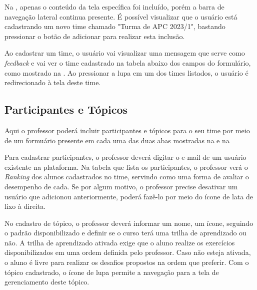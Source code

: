 
Na , apenas o conteúdo da tela específica foi incluído, porém a barra de navegação lateral continua presente. É possível visualizar que o usuário está cadastrando um novo time chamado "Turma de APC 2023/1", bastando pressionar o botão de adicionar para realizar esta inclusão.


Ao cadastrar um time, o usuário vai visualizar uma mensagem que serve como \textit{feedback} e vai ver o time cadastrado na tabela abaixo dos campos do formulário, como mostrado na . Ao pressionar a lupa em um dos times listados, o usuário é redirecionado à tela deste time.

\subsection{Participantes e Tópicos}

Aqui o professor poderá incluir participantes e tópicos para o seu time por meio de um formuário presente em cada uma das duas abas mostradas na  e na  


Para cadastrar participantes, o professor deverá digitar o e-mail de um usuário existente na plataforma. Na tabela que lista os participantes, o professor verá o \textit{Ranking} dos alunos cadastrados no time, servindo como uma forma de avaliar o desempenho de cada. Se por algum motivo, o professor precise desativar um usuário que adicionou anteriormente, poderá fazê-lo por meio do ícone de lata de lixo à direita.


No cadastro de tópico, o professor deverá informar um nome, um ícone, seguindo o padrão disponibilizado e definir se o curso terá uma trilha de aprendizado ou não. A trilha de aprendizado ativada exige que o aluno realize os exercícios disponibilizados em uma ordem definida pelo professor. Caso não esteja ativada, o aluno é livre para realizar os desafios propostos na ordem que preferir. Com o tópico cadastrado, o ícone de lupa permite a navegação para a tela de gerenciamento deste tópico.

